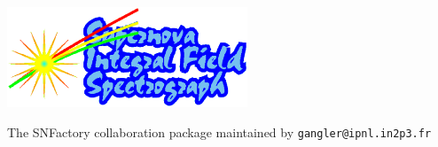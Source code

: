 %
%

\begin{center}
\hspace{-1.8cm}{\Huge \bf IFU/Ccd}
\vskip 0.5cm 
\hspace{-1.8cm}{\Large \bf Preprocessing package for SNIFS}
\vskip 0.5cm 
\vspace{1.0cm}

\hspace{-1.9cm}
\includegraphics[height=3cm,bb=55mm 103mm 160mm 177mm]{snifs}

\vspace{1.5cm}

\hspace{-1.7cm} {\Large The SNFactory collaboration}
\vskip 0.5cm
\hspace{-1.7cm} {package maintained by \tt gangler@ipnl.in2p3.fr }
\vspace{2.0cm}
\end{center}

%

